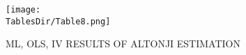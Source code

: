 \hypertarget{Altonji}{}
\begin{table}
  \centerline{\texttt{[image: \\TablesDir/Table8.png]}}
  \caption{\scriptsize ML, OLS, IV RESULTS OF ALTONJI ESTIMATION} 
  \label{tab:Altonji}
\end{table}